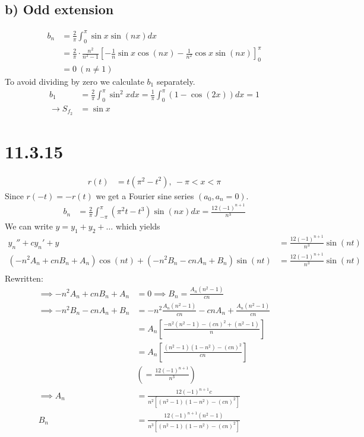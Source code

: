 \documentclass[11pt,a4paper]{article}
\begin{document}
\subsection*{b) Odd extension}
\begin{align*}
    b_n &= \frac{2}{\pi} \int_0^\pi \sin x \sin(nx) dx \\
    &= \frac{2}{\pi} \cdot \frac{n^2}{n^2-1} \left[
        -\frac{1}{n}\sin x \cos(nx) - \frac{1}{n^2}\cos x \sin(nx)
    \right]_0^\pi \\
    &= 0\ (n \neq 1)
\end{align*}
To avoid dividing by zero we calculate $b_1$ separately.
\begin{align*}
    b_1 &= \frac{2}{\pi} \int_0^\pi \sin^2 x dx 
    = \frac{1}{\pi} \int_0^\pi (1-\cos(2x))dx
    = 1 \\
    \rightarrow S_{f_2} 
    &= \sin x
\end{align*}

\section*{11.3.15}
\begin{align*}
    r(t) &= t(\pi^2 - t^2),\ -\pi<x<\pi
\end{align*}
Since $r(-t)=-r(t)$ we get a Fourier sine series $(a_0, a_n = 0)$.
\begin{align*}
    b_n &= \frac{2}{\pi} \int_{-\pi}^\pi (\pi^2 t-t^3)\sin(nx)dx = \frac{12(-1)^{n+1}}{n^3}
\end{align*}
We can write $y = y_1 + y_2 + \dots$ which yields 
\begin{align*}
    y_n''+cy_n'+y &= \frac{12(-1)^{n+1}}{n^3} \sin(nt) \\
    (-n^2A_n + cnB_n + A_n)\cos(nt) + (-n^2B_n-cnA_n+B_n)\sin(nt) &= \frac{12(-1)^{n+1}}{n^3} \sin(nt) \\
\end{align*}
Rewritten:
\begin{align*}
    \implies -n^2A_n + cnB_n + A_n &= 0
    \implies B_n = \frac{A_n(n^2-1)}{cn} \\
    \implies -n^2B_n-cnA_n+B_n &= -n^2 \frac{A_n(n^2-1)}{cn} - cnA_n + \frac{A_n(n^2-1)}{cn} \\
    &= A_n \left[
        \frac{-n^2(n^2-1)-(cn)^2+(n^2-1)}{n}
    \right] \\
    &= A_n \left[
        \frac{(n^2-1)(1-n^2)-(cn)^2}{cn}
    \right] \\
    &\left(= \frac{12(-1)^{n+1}}{n^3} \right) \\
    \implies A_n &= \frac
        {12(-1)^{n+1}c}
        {n^2[(n^2-1)(1-n^2)-(cn)^2]} \\
    B_n &= \frac
        {12(-1)^{n+1}(n^2-1)}
        {n^3[(n^2-1)(1-n^2)-(cn)^2]}
\end{align*}
\end{document}
